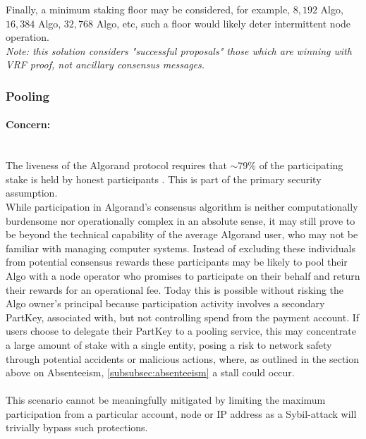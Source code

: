 \documentclass[11pt,a4paper]{article}
\begin{document}
Finally, a minimum staking floor may be considered, for example, $8,192$ Algo, $16,384$ Algo, $32,768$ Algo, etc, such a
floor would likely deter intermittent node operation. \\ 

\emph{Note: this solution considers "successful proposals" those which are winning with VRF proof, not ancillary 
      consensus messages.} 

\pagebreak

\subsubsection{Pooling}

\paragraph{Concern:} \mbox{}\\
The liveness of the Algorand protocol requires that $\sim$79\% of the participating stake is held by honest participants
. This is part of the primary security assumption. \\
While participation in Algorand's consensus algorithm is neither computationally burdensome nor operationally complex in 
an absolute sense, it may still prove to be beyond the technical capability of the average Algorand user, who may not
be familiar with managing computer systems. Instead of excluding these individuals from potential consensus rewards 
these participants may be likely to pool their Algo with a node operator who promises to participate on their behalf and 
return their rewards for an operational fee. Today this is possible without risking the Algo owner’s principal because 
participation activity involves a secondary \gls{PartKey}, associated with, but not controlling spend from the 
payment account. If users choose to delegate their \gls{PartKey} to a pooling service, this may concentrate a large 
amount of stake with a single entity, posing a risk to network safety through potential accidents or malicious actions, 
where, as outlined in the section above on Absenteeism, \ref{subsubsec:absenteeism} a stall could occur. \\ \\
This scenario cannot be meaningfully mitigated by limiting the maximum participation from a particular account, 
node or IP address as a Sybil-attack will trivially bypass such protections.
\end{document}
